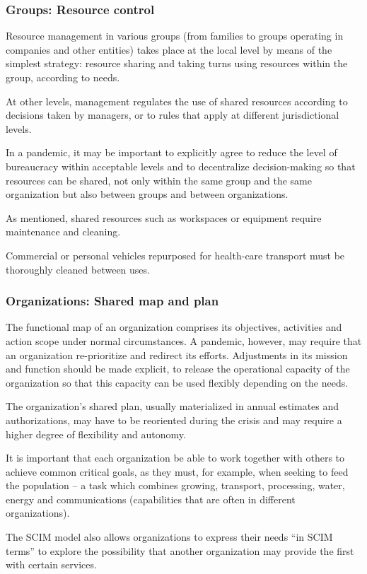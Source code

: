 \documentclass[12pt, a4]{scrartcl}
\begin{document}
\subsubsection{Groups: Resource control}
Resource management in various groups (from families to groups operating in companies and other entities) takes place at the local level by means of the simplest strategy: resource sharing and taking turns using resources within the group, according to needs.

At other levels, management regulates the use of shared resources according to decisions taken by managers, or to rules that apply at different jurisdictional levels.

In a pandemic, it may be important to explicitly agree to reduce the level of bureaucracy within acceptable levels and to decentralize decision-making so that resources can be shared, not only within the same group and the same organization but also between groups and between organizations.

As mentioned, shared resources such as workspaces or equipment require maintenance and cleaning. 

Commercial or personal vehicles repurposed for health-care transport must be thoroughly cleaned between uses.

\subsubsection{Organizations: Shared map and plan}
The functional map of an organization comprises its objectives, activities and action scope under normal circumstances. A pandemic, however, may require that an organization re-prioritize and redirect its efforts. Adjustments in its mission and function should be made explicit, to release the operational capacity of the organization so that this capacity can be used flexibly depending on the needs. 

The organization's shared plan, usually materialized in annual estimates and authorizations, may have to be reoriented during the crisis and may require a higher degree of flexibility and autonomy. 

It is important that each organization be able to work together with others to achieve common critical goals, as they must, for example, when seeking to feed the population – a task which combines growing, transport, processing, water, energy and communications (capabilities that are often in different organizations).

The SCIM model also allows organizations to express their needs “in SCIM terms” to explore the possibility that another organization may provide the first with certain services.
\end{document}
